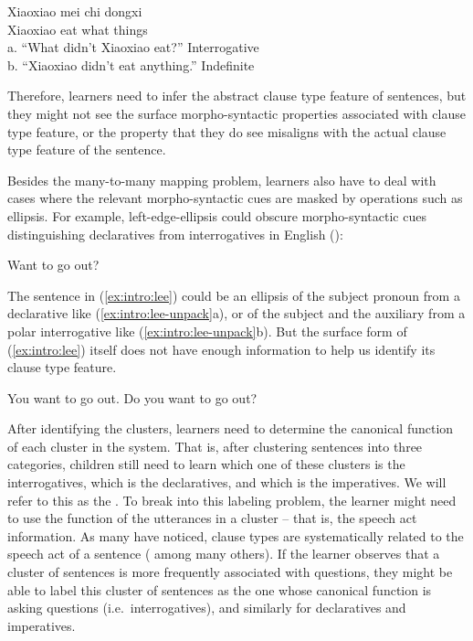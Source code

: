 \gll Xiaoxiao mei 	chi 	 dongxi\\ 
Xiaoxiao \Neg{} 	eat	what	things\\
a.	``What didn’t Xiaoxiao eat?''	\hfill Interrogative \twh\\
b.	``Xiaoxiao didn’t eat anything.''		\hfill Indefinite \twh
\eex

Therefore, learners need to infer the abstract clause type feature of sentences, but they might not see the surface morpho-syntactic properties associated with clause type feature, or the property that they do see misaligns with the actual clause type feature of the sentence.

Besides the many-to-many mapping problem, learners also have to deal with cases where the relevant morpho-syntactic cues are masked by operations such as ellipsis.  For example, left-edge-ellipsis could obscure morpho-syntactic cues distinguishing declaratives from interrogatives in English (\cite{zwickypullum1983leftedge}):

Want to go out?
\eex

The sentence in (\ref{ex:intro:lee}) could be an ellipsis of  the subject pronoun from a declarative like (\ref{ex:intro:lee-unpack}a), or of the subject and the auxiliary from a polar interrogative like (\ref{ex:intro:lee-unpack}b). But the surface form of (\ref{ex:intro:lee}) itself does not have enough information to help us identify its clause type feature. 

\bxl
You want to go out.
\ex Do you want to go out?
\exl
\eex


%

After identifying the clusters, learners need to determine the canonical function of each cluster in the system. That is, after clustering sentences into three categories, children still need to learn which one of these clusters is the interrogatives, which is the declaratives, and which is the imperatives. We will refer to this as the . To break into this labeling problem, the learner might need to use the function of the utterances in a cluster -- that is, the speech act information. As many have noticed, clause types are systematically related to the speech act of a sentence (\cite{katzpostal1964, sz1985speechact, portner2018} among many others). If the learner observes that a cluster of sentences is more frequently associated with questions, they might be able to label this cluster of sentences as the one whose canonical function is asking questions (i.e.\ interrogatives), and similarly for declaratives and imperatives. 

